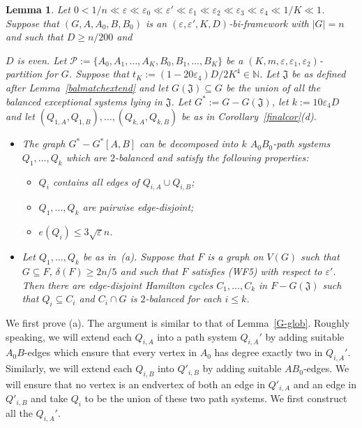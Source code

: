 \documentclass{memo-l}
\newtheorem{lemma}[firstthm]{Lemma}
\def\COMMENT#1{}
\def\proof{\removelastskip\penalty55\medskip\noindent{\bf Proof. }}
\def\cP{\mathcal{P}}
\def\eps{\varepsilon}
\numberwithin{section}{chapter}
\numberwithin{equation}{section}
\numberwithin{firstthm}{section}
\numberwithin{figure}{section}
\begin{document}
{\begin{lemma}\label{lem:HCglob}
Let $0<1/n\ll \eps\ll \eps_0\ll \eps'\ll \eps_1\ll \eps_2\ll \eps_3\ll \eps_4\ll 1/K\ll 1$.
Suppose that $(G,A,A_0,B,B_0)$ is an $(\eps,\eps',K,D)$-bi-framework with $|G|=n$ and such that $D\ge n/200$ and%
   \COMMENT{Daniela: had $\delta (G) \geq D\ge n/200$}
$D$ is even. Let $\cP:=\{A_0,A_1,\dots,A_K,B_0,B_1,\dots,B_K\}$ be a $(K,m,\eps,\eps_1,\eps_2)$-partition for $G$. 
Suppose that $t_K:=(1-20\eps_4)D/2K^4\in \mathbb{N}$. Let $\mathfrak{J}$ be as defined after Lemma~\ref{balmatchextend}
and let $G(\mathfrak{J})\subseteq G$ be the union of all the balanced exceptional systems lying in $\mathfrak{J}$.
Let $G^*:=G-G(\mathfrak{J})$, let $k:=10\eps_4 D$ and let $(Q_{1,A},Q_{1,B}),\dots,(Q_{k,A},Q_{k,B})$ be as in Corollary~\ref{finalcor}(d).
\begin{itemize}
\item[{\rm (a)}] The graph $G^*-G^*[A,B]$ can be decomposed into $k$ $A_0B_0$-path systems $Q_1,\dots,Q_k$ which are $2$-balanced and satisfy the
following properties:
\begin{itemize}
\item[{\rm (i)}] $Q_i$ contains all edges of $Q_{i,A} \cup Q_{i,B}$; 
\item[{\rm (ii)}]  $Q_1,\dots,Q_k$ are pairwise edge-disjoint;
\item[\rm{(iii)}] $e(Q_i) \le 3\sqrt{\eps}n$.
\end{itemize}
\item[{\rm (b)}] Let $Q_1,\dots,Q_k$ be as in~(a). Suppose that $F$ is a graph on $V(G)$ such that $G\subseteq F$, $\delta(F)\ge 2n/5$ and such that $F$ satisfies
(WF5) with respect to $\eps'$. Then there are edge-disjoint Hamilton cycles $C_1,\dots,C_k$ in $F-G(\mathfrak{J})$
such that $Q_i \subseteq C_i$ and  $C_i \cap G$ is $2$-balanced for each $i\le k$. 
\end{itemize}
\end{lemma}
\proof
We first prove (a). The argument is similar to that of Lemma~\ref{G-glob}. Roughly speaking, we will extend
each $Q_{i,A}$ into a path system $Q_{i,A}'$ by adding suitable $A_0B$-edges which ensure that 
every vertex in $A_0$ has degree exactly two in $Q_{i,A}'$. 
Similarly, we will extend each $Q_{i,B}$ into $Q'_{i,B}$ by adding suitable $AB_0$-edges. 
We will ensure that no vertex is an endvertex of both an edge in $Q'_{i,A}$ and an edge in $Q'_{i,B}$ and take $Q_i$ to
be the union of these two path systems. We first construct all the $Q_{i,A}'$.

}
\end{document}
